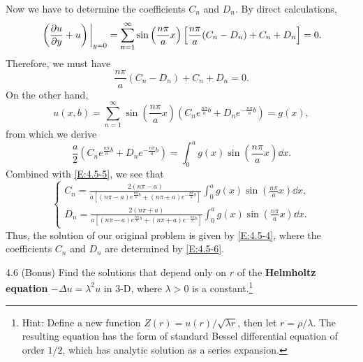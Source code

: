 \begin{enumerate}[label=(\arabic*)]
\begin{equation}
        \end{equation}
        Now we have to determine the coefficients $C_n$ and $D_n$. By direct calculations,
        \[
            \eval{\left(\pdv{u}{y}+u\right)}_{y=0} = \sum_{n=1}^\infty \sin\left(\frac{n\pi}{a}x\right)\left[\frac{n\pi}{a}(C_n-D_n)+C_n+D_n\right] = 0.
        \]
        Therefore, we must have
        \begin{equation}\label{E:4.5-5}
            \frac{n\pi}{a}(C_n-D_n) + C_n + D_n = 0.
        \end{equation}
        On the other hand,
        \[
            u(x,b) = \sum_{n=1}^\infty\sin\left(\frac{n\pi}{a}x\right)\left(C_ne^{\frac{n\pi}{a}b} + D_ne^{-\frac{n\pi}{a}b}\right) = g(x),
        \]
        from which we derive
        \[
            \frac{a}{2}\left(C_ne^{\frac{n\pi}{a}b} + D_ne^{-\frac{n\pi}{a}b}\right) = \int_0^a g(x)\sin\left(\frac{n\pi}{a}x\right) \dd x.
        \]
        Combined with \eqref{E:4.5-5}, we see that
        \begin{equation}\label{E:4.5-6}
            \begin{cases}
                C_n = \frac{2(n\pi-a)}{a\left[(n\pi-a)e^{\frac{n\pi}{a}b}+(n\pi+a)e^{-\frac{n\pi}{a}b}\right]} \int_0^a g(x)\sin\left(\frac{n\pi}{a}x\right) \dd x, \\
                D_n = \frac{2(n\pi+a)}{a\left[(n\pi-a)e^{\frac{n\pi}{a}b}+(n\pi+a)e^{-\frac{n\pi}{a}b}\right]} \int_0^a g(x)\sin\left(\frac{n\pi}{a}x\right) \dd x.
            \end{cases}
        \end{equation}
        Thus, the solution of our original problem is given by \eqref{E:4.5-4}, where the coefficients $C_n$ and $D_n$ are determined by \eqref{E:4.5-6}.
\end{enumerate}


\begin{question}{4.6 (Bonus) }{}
    Find the solutions that depend only on $r$ of the \textbf{Helmholtz equation} $-\Delta u=\lambda^2 u$ in 3-D, where $\lambda>0$ is a constant.\footnote{Hint: Define a new function $Z(r)=u(r)/\sqrt{\lambda r}$, then let $r=\rho/\lambda$. The resulting equation has the form of standard Bessel differential equation of order $1/2$, which has analytic solution as a series expansion.}
\end{question}



